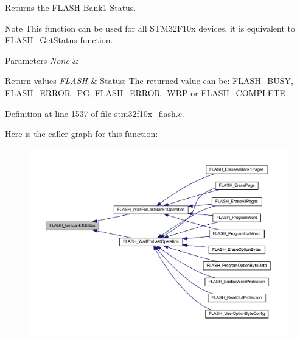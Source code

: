 Returns the F\+L\+A\+SH Bank1 Status. 

\begin{DoxyNote}{Note}
This function can be used for all S\+T\+M32\+F10x devices, it is equivalent to F\+L\+A\+S\+H\+\_\+\+Get\+Status function. 
\end{DoxyNote}

\begin{DoxyParams}{Parameters}
{\em None} & \\
\hline
\end{DoxyParams}

\begin{DoxyRetVals}{Return values}
{\em F\+L\+A\+SH} & Status\+: The returned value can be\+: F\+L\+A\+S\+H\+\_\+\+B\+U\+SY, F\+L\+A\+S\+H\+\_\+\+E\+R\+R\+O\+R\+\_\+\+PG, F\+L\+A\+S\+H\+\_\+\+E\+R\+R\+O\+R\+\_\+\+W\+RP or F\+L\+A\+S\+H\+\_\+\+C\+O\+M\+P\+L\+E\+TE \\
\hline
\end{DoxyRetVals}


Definition at line 1537 of file stm32f10x\+\_\+flash.\+c.

Here is the caller graph for this function\+:
\nopagebreak
\begin{figure}[H]
\begin{center}
\leavevmode
\includegraphics[width=350pt]{group___f_l_a_s_h___exported___functions_ga9d5b76b75ef4c578cc45dc836a1929b6_icgraph}
\end{center}
\end{figure}
\mbox{\label{group___f_l_a_s_h___exported___functions_gae3fb545e32f21501ca27d4380e0f2088}} 
